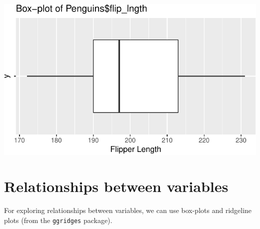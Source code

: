 \documentclass[letterpaper,9pt,twoside,]{pinp}
\begin{document}
\begin{center}\includegraphics{img/geom_boxplot-1} \end{center}

\hypertarget{relationships-between-variables}{%
\section{Relationships between
variables}\label{relationships-between-variables}}

For exploring relationships between variables, we can use box-plots and
ridgeline plots (from the \texttt{ggridges} package).

\begin{Shaded}
\begin{Highlighting}[]
\OtherTok{\textless{}{-}} \NormalTok{(}
      \NormalTok{,}
      \NormalTok{,}
      \NormalTok{,}
      \NormalTok{,}
      \NormalTok{)}
\SpecialCharTok{\%\textgreater{}\%}  
  \NormalTok{() }\SpecialCharTok{+} 
  \NormalTok{(}\NormalTok{(}
                       \SpecialCharTok{/}\NormalTok{) }\SpecialCharTok{+} 
\end{Highlighting}
\end{Shaded}
\end{document}
